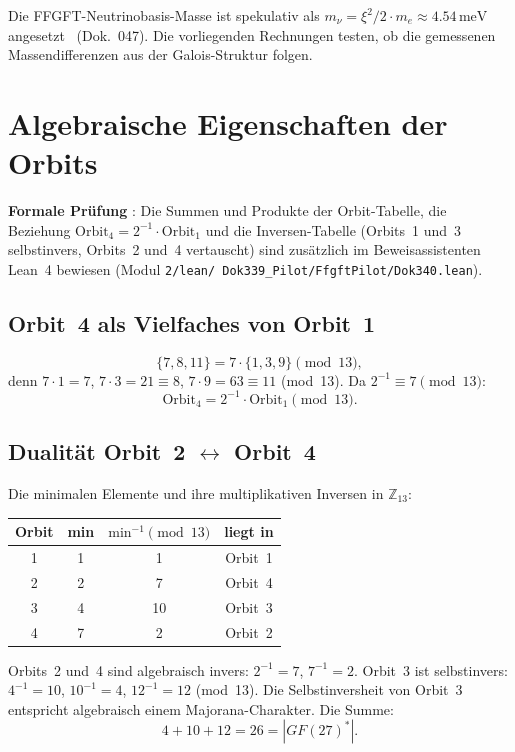 Die FFGFT-Neutrinobasis-Masse ist spekulativ als
$m_\nu=\xi^2/2\cdot m_e\approx4.54\,\text{meV}$ angesetzt \SM\
(Dok.~047). Die vorliegenden Rechnungen testen, ob die gemessenen
Massendifferenzen aus der Galois-Struktur folgen.

\section{Algebraische Eigenschaften der Orbits \BM\,\LM}

\noindent\textbf{Formale Prüfung} \LM: Die Summen und Produkte der Orbit-Tabelle,
die Beziehung $\text{Orbit}_4=2^{-1}\cdot\text{Orbit}_1$ und die Inversen-Tabelle
(Orbits~1 und~3 selbstinvers, Orbits~2 und~4 vertauscht) sind zusätzlich im
Beweisassistenten Lean~4 bewiesen (Modul \texttt{2/\allowbreak lean/\allowbreak
Dok339\_Pilot/\allowbreak FfgftPilot/\allowbreak Dok340.lean}).

\subsection{Orbit~4 als Vielfaches von Orbit~1}

\[
\{7,8,11\}=7\cdot\{1,3,9\}\pmod{13},
\]
denn $7\cdot1=7$, $7\cdot3=21\equiv8$, $7\cdot9=63\equiv11$ (mod~13).
Da $2^{-1}\equiv7\pmod{13}$:
\[
\boxed{\text{Orbit}_4=2^{-1}\cdot\text{Orbit}_1\pmod{13}.}
\]

\subsection{Dualität Orbit~2 $\leftrightarrow$ Orbit~4}

Die minimalen Elemente und ihre multiplikativen Inversen in $\mathbb{Z}_{13}$:

\begin{center}
\begin{tabular}{cccc}
\toprule
Orbit & min & $\text{min}^{-1}\!\pmod{13}$ & liegt in \\
\midrule
1 & 1 & 1 & Orbit~1 \\
2 & 2 & 7 & Orbit~4 \\
3 & 4 & 10 & Orbit~3 \\
4 & 7 & 2 & Orbit~2 \\
\bottomrule
\end{tabular}
\end{center}

Orbits~2 und~4 sind algebraisch invers: $2^{-1}=7$, $7^{-1}=2$.
Orbit~3 ist selbstinvers: $4^{-1}=10$, $10^{-1}=4$, $12^{-1}=12$
(mod~13). Die Selbstinversheit von Orbit~3 entspricht algebraisch
einem Majorana-Charakter. Die Summe:
\[
4+10+12=26=|GF(27)^*|.
\]

